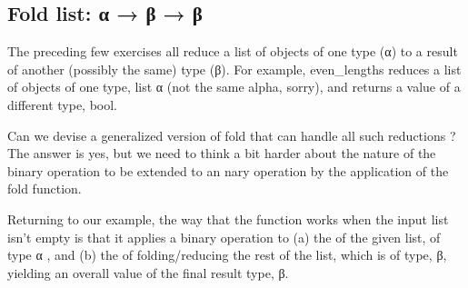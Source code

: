 \documentclass[letterpaper,10pt,english]{sphinxmanual}
\begin{document}
\begin{sphinxVerbatim}[commandchars=\\\{\}]
    \PYG{o}{[}\PYG{o}{]}    
   \PYG{o}{[}\PYG{o}{[}\PYG{o}{]}\PYG{o}{[}\PYG{o}{]}\PYG{o}{[}\PYG{o}{]}\PYG{o}{]}    
   \PYG{o}{[}\PYG{o}{[}\PYG{o}{]}\PYG{o}{[}\PYG{o}{]}\PYG{o}{[}\PYG{o}{]}\PYG{o}{]}    
   \PYG{o}{[}\PYG{o}{[}\PYG{o}{]}\PYG{o}{[}\PYG{o}{]}\PYG{o}{[}\PYG{o}{]}\PYG{o}{]}    
\end{sphinxVerbatim}


\subsection{Fold list: α → β → β}
\label{\detokenize{A_03_Recursive_Types:id5}}
\sphinxAtStartPar
The preceding few exercises all reduce a list of objects of
one type (α) to a result of another (possibly the same) type
(β). For example, even\_lengths reduces a list of objects of
one type, list α (not the same alpha, sorry), and returns a
value of a different type, bool.

\sphinxAtStartPar
Can we devise a generalized version of fold that can handle
all such reductions ? The answer is yes,
but we need to think a bit harder about the nature of the
binary operation to be extended to an n\sphinxhyphen{}ary operation by
the application of the fold function.

\sphinxAtStartPar
Returning to our example, the way that the function works
when the input list isn’t empty is that it applies a binary
operation to (a) the  of the given list, of type α ,
and (b) the  of folding/reducing the rest of the
list, which is of type, β, yielding an overall value of the
final result type, β.
\end{document}
